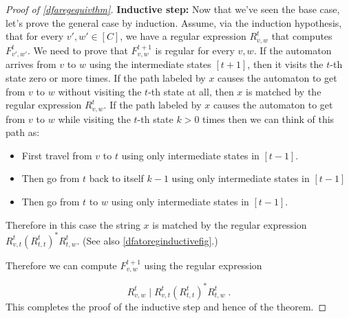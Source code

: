\begin{proof}[Proof of \cref{dfaregequivthm}]
\textbf{Inductive step:} Now that we've seen the base case, let's prove
the general case by induction. Assume, via the induction hypothesis,
that for every \(v',w' \in [C]\), we have a regular expression
\(R_{v,w}^t\) that computes \(F_{v',w'}^t\). We need to prove that
\(F_{v,w}^{t+1}\) is regular for every \(v,w\). If the automaton arrives
from \(v\) to \(w\) using the intermediate states \([t+1]\), then it
visits the \(t\)-th state zero or more times. If the path labeled by
\(x\) causes the automaton to get from \(v\) to \(w\) without visiting
the \(t\)-th state at all, then \(x\) is matched by the regular
expression \(R_{v,w}^t\). If the path labeled by \(x\) causes the
automaton to get from \(v\) to \(w\) while visiting the \(t\)-th state
\(k>0\) times then we can think of this path as:

\begin{itemize}
\item
  First travel from \(v\) to \(t\) using only intermediate states in
  \([t-1]\).
\item
  Then go from \(t\) back to itself \(k-1\) using only intermediate
  states in \([t-1]\)
\item
  Then go from \(t\) to \(w\) using only intermediate states in
  \([t-1]\).
\end{itemize}

Therefore in this case the string \(x\) is matched by the regular
expression \(R_{v,t}^t(R_{t,t}^t)^* R_{t,w}^t\). (See also
\cref{dfatoreginductivefig}.)

Therefore we can compute \(F_{v,w}^{t+1}\) using the regular expression

\[R_{v,w}^t \;|\; R_{v,t}^t(R_{t,t}^t)^* R_{t,w}^t\;.\] This completes
the proof of the inductive step and hence of the theorem.

\end{proof}


